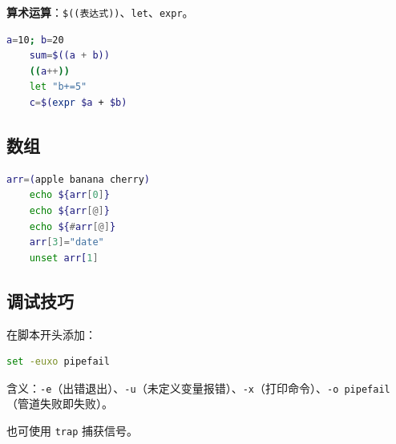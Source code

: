 \textbf{算术运算}：\texttt{\$((表达式))}、\texttt{let}、\texttt{expr}。
\begin{lstlisting}[language=bash]
	a=10; b=20
	sum=$((a + b))
	((a++))
	let "b+=5"
	c=$(expr $a + $b)
\end{lstlisting}

\subsection{数组}
\begin{lstlisting}[language=bash]
	arr=(apple banana cherry)
	echo ${arr[0]}
	echo ${arr[@]}
	echo ${#arr[@]}
	arr[3]="date"
	unset arr[1]
\end{lstlisting}

\subsection{调试技巧} 在脚本开头添加：
\begin{lstlisting}[language=bash]
	set -euxo pipefail
\end{lstlisting}
含义：\texttt{-e}（出错退出）、\texttt{-u}（未定义变量报错）、\texttt{-x}（打印命令）、\texttt{-o pipefail}（管道失败即失败）。

也可使用 \texttt{trap} 捕获信号。

